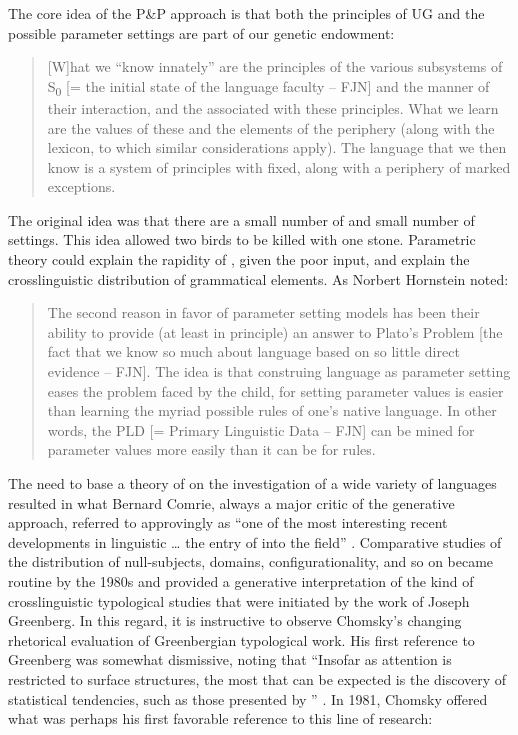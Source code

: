 \documentclass[output=paper,
modfonts
]{LSP/langsci}
\begin{document}
The core idea of the P\&P approach is that both the principles of UG and
the possible parameter settings are part of our genetic endowment:

\begin{quote}
{[}W{]}hat we ``know innately'' are the principles of the various
subsystems of S\textsubscript{0} {[}= the initial state of the language
faculty  --  FJN{]} and the manner of their interaction, and the
 associated with these principles. What we learn are the
values of these  and the elements of the periphery (along with
the lexicon, to which similar considerations apply). The language that
we then know is a system of principles with  fixed, along with
a periphery of marked exceptions. \citep[150--151]{chomsky1986}
\end{quote}

The original idea was that there are a small number of  and
small number of settings. This idea allowed two birds to be killed with
one stone. Parametric theory could explain the rapidity of ,
given the poor input, and explain the crosslinguistic distribution of
grammatical elements. As Norbert Hornstein noted:

\begin{quote}
The second reason in favor of parameter setting models has been their
ability to provide (at least in principle) an answer to Plato's Problem
{[}the fact that we know so much about language based on so little
direct evidence  --  FJN{]}. The idea is that construing language
 as parameter setting eases the problem faced by the child,
for setting parameter values is easier than learning the myriad possible
rules of one's native language. In other words, the PLD {[}= Primary
Linguistic Data  --  FJN{]} can be mined for parameter values more easily
than it can be for rules. \citep[165]{hornstein2009}
\end{quote}

The need to base a theory of  on the investigation
of a wide variety of languages resulted in what Bernard Comrie, always a
major critic of the generative approach, referred to approvingly as ``one
of the most interesting recent developments in linguistic  {\ldots}
the entry of  into the field'' \citep[458]{comrie1988}.
Comparative studies of the distribution of null-subjects, 
domains, configurationality, and so on became routine by the 1980s and
provided a generative interpretation of the kind of crosslinguistic
typological studies that were initiated by the work of Joseph Greenberg.
In this regard, it is instructive to observe Chomsky's changing
rhetorical evaluation of Greenbergian typological work. His first
reference to Greenberg was somewhat dismissive, noting that ``Insofar as
attention is restricted to surface structures, the most that can be
expected is the discovery of statistical tendencies, such as those
presented by \citet{greenberg1963n}'' \citep[118]{chomsky1965}. In 1981, Chomsky
offered what was perhaps his first favorable reference to this line of
research:
\end{document}
